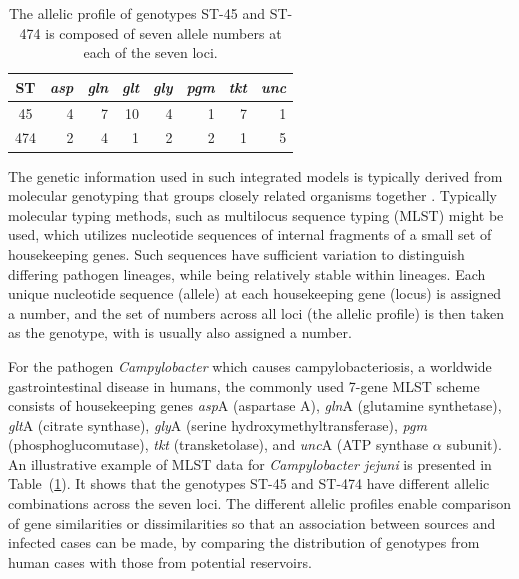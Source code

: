 \documentclass[times, doublespace]{simauth}%
\begin{document}
\begin{table}
  \begin{center}
    \begin{tabular}{crrrrrrr}
      \toprule
      ST & \textit{asp} & \textit{gln} & \textit{glt} & \textit{gly} & \textit{pgm}& \textit{tkt}& \textit{unc}\\ \midrule
      45  & 4 & 7 & 10 & 4 & 1 & 7 & 1\\
      474 & 2 & 4 & 1 & 2 & 2 & 1 & 5 \\
      \bottomrule
    \end{tabular}
  \end{center}
  \caption{The allelic profile of genotypes ST-45 and ST-474 is composed of seven allele numbers at each of the seven loci.}
  \label{tab0}
\end{table}

The genetic information used in such integrated models is typically derived from molecular genotyping that groups closely related organisms together \cite{Cotta}. Typically molecular typing methods, such as multilocus sequence typing (MLST) \cite{Dingl, Coll, Urwin} might be used, which utilizes nucleotide sequences of internal fragments of a small set of housekeeping genes. Such sequences have sufficient variation to distinguish differing pathogen lineages, while being relatively stable within lineages. Each unique nucleotide sequence (allele) at each housekeeping gene (locus) is assigned a number, and the set of numbers across all loci (the allelic profile) is then taken as the genotype, with is usually also assigned a number.

For the pathogen \textit{Campylobacter} which causes campylobacteriosis, a worldwide gastrointestinal disease in humans, the commonly used 7-gene MLST scheme consists of housekeeping genes \textit{asp}A (aspartase A), \textit{gln}A (glutamine synthetase), \textit{glt}A (citrate synthase), \textit{gly}A (serine hydroxymethyltransferase), \textit{pgm} (phosphoglucomutase), \textit{tkt} (transketolase), and \textit{unc}A (ATP synthase $\alpha$ subunit). An illustrative example of MLST data for \emph{Campylobacter jejuni} is presented in Table~(\ref{tab0}). It shows that the genotypes ST-45 and ST-474 have different allelic combinations across the seven loci. The different allelic profiles enable comparison of gene similarities or dissimilarities so that an association between sources and infected cases can be made, by comparing the distribution of genotypes from human cases with those from potential reservoirs.
\end{document}
